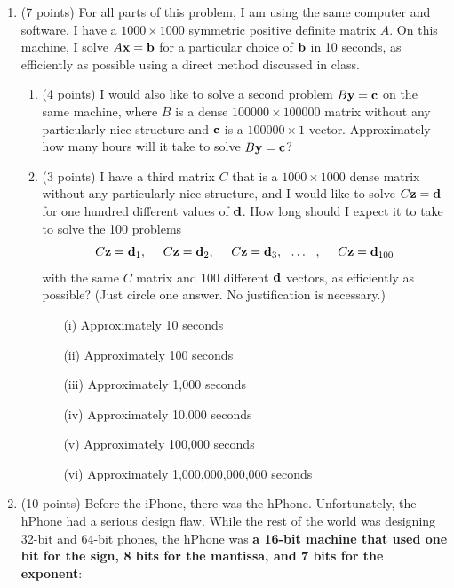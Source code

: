 \documentclass[12point]{article}
\def\d{{\bf d}}
\def\b{{\bf b}}
\def\c{{\bf c}}
\def\x{{\bf x}}
\def\y{{\bf y}}
\def\z{{\bf z}}
\begin{document}
\newpage
\begin{enumerate}

\item (7 points)
For all parts of this problem, I am using the same computer and software. I have a $1000 \times 1000$ symmetric positive definite matrix $A$. On this machine, I solve $A\x=\b$ for a particular choice of $\b$ in 10 seconds, as efficiently as possible using a direct method discussed in class.

\begin{enumerate}
\item (4 points) I would also like to solve a second problem $B\y=\c$ on the same machine, where $B$ is a dense $100000 \times 100000$ matrix without any particularly nice structure and $\c$ is a $100000 \times 1$ vector. Approximately how many hours will it take to solve $B\y=\c$?
\vspace{2.75in}

\item (3 points) I have a third matrix $C$ that is a $1000 \times 1000$ dense matrix without any particularly nice structure, and I would like to solve $C\z=\d$ for one hundred different values of $\d$. How long should I expect it to take to solve the 100 problems
$$ C\z=\d_1,~~~~C\z=\d_2,~~~~C\z=\d_3,~~\ldots~~,~~~~C\z=\d_{100} $$
with the same $C$ matrix and 100 different $\d$ vectors, as efficiently as possible? (Just circle one answer. No justification is necessary.)
\medskip

\begin{itemize}
\item[(i)] Approximately 10 seconds
\item[(ii)] Approximately 100 seconds
\item[(iii)] Approximately 1,000 seconds
\item[(iv)] Approximately 10,000 seconds
\item[(v)] Approximately 100,000 seconds
\item[(vi)] Approximately 1,000,000,000,000 seconds
\end{itemize}  
\bigskip
\vspace{.7in}
\end{enumerate}




\newpage
\item (10 points)
Before the iPhone, there was the hPhone. Unfortunately, the hPhone had a serious design flaw. While the rest of the world was designing 32-bit and 64-bit phones, the hPhone was {\bf a 16-bit machine that used one bit for the sign, 8 bits for the mantissa, and 7 bits for the exponent}:
\medskip


\end{enumerate}
\end{document}
